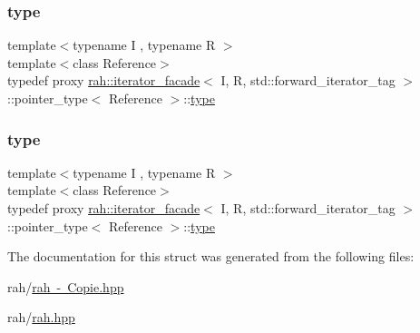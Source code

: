 \subsubsection{\texorpdfstring{type}{type}\hspace{0.1cm}{\footnotesize\ttfamily [1/2]}}
{\footnotesize\ttfamily template$<$typename I , typename R $>$ \\
template$<$class Reference$>$ \\
typedef proxy \mbox{\hyperlink{structrah_1_1iterator__facade}{rah\+::iterator\+\_\+facade}}$<$ I, R, std\+::forward\+\_\+iterator\+\_\+tag $>$\+::pointer\+\_\+type$<$ Reference $>$\+::\mbox{\hyperlink{structrah_1_1iterator__facade_3_01_i_00_01_r_00_01std_1_1forward__iterator__tag_01_4_1_1pointer__type_a2289999abe125951a510673b21746a0d}{type}}}

\mbox{\label{structrah_1_1iterator__facade_3_01_i_00_01_r_00_01std_1_1forward__iterator__tag_01_4_1_1pointer__type_a2289999abe125951a510673b21746a0d}} 
\subsubsection{\texorpdfstring{type}{type}\hspace{0.1cm}{\footnotesize\ttfamily [2/2]}}
{\footnotesize\ttfamily template$<$typename I , typename R $>$ \\
template$<$class Reference$>$ \\
typedef proxy \mbox{\hyperlink{structrah_1_1iterator__facade}{rah\+::iterator\+\_\+facade}}$<$ I, R, std\+::forward\+\_\+iterator\+\_\+tag $>$\+::pointer\+\_\+type$<$ Reference $>$\+::\mbox{\hyperlink{structrah_1_1iterator__facade_3_01_i_00_01_r_00_01std_1_1forward__iterator__tag_01_4_1_1pointer__type_a2289999abe125951a510673b21746a0d}{type}}}



The documentation for this struct was generated from the following files\+:\begin{DoxyCompactItemize}
\item 
rah/\mbox{\hyperlink{rah_01-_01_copie_8hpp}{rah -\/ Copie.\+hpp}}\item 
rah/\mbox{\hyperlink{rah_8hpp}{rah.\+hpp}}\end{DoxyCompactItemize}
